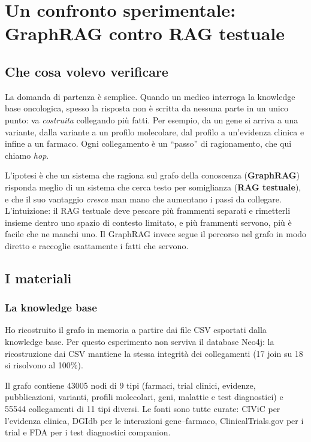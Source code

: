 \documentclass[11pt,a4paper]{report}
\begin{document}
\chapter{Un confronto sperimentale: GraphRAG contro RAG testuale}
\label{ch:graphrag-vs-rag}

\section{Che cosa volevo verificare}

La domanda di partenza è semplice. Quando un medico interroga la knowledge
base oncologica, spesso la risposta non è scritta da nessuna parte in un
unico punto: va \emph{costruita} collegando più fatti. Per esempio, da un
gene si arriva a una variante, dalla variante a un profilo molecolare, dal
profilo a un'evidenza clinica e infine a un farmaco. Ogni collegamento è un
``passo'' di ragionamento, che qui chiamo \emph{hop}.

L'ipotesi è che un sistema che ragiona sul grafo della conoscenza
(\textbf{GraphRAG}) risponda meglio di un sistema che cerca testo per
somiglianza (\textbf{RAG testuale}), e che il suo vantaggio \emph{cresca}
man mano che aumentano i passi da collegare. L'intuizione: il RAG testuale
deve pescare più frammenti separati e rimetterli insieme dentro uno spazio
di contesto limitato, e più frammenti servono, più è facile che ne manchi
uno. Il GraphRAG invece segue il percorso nel grafo in modo diretto e
raccoglie esattamente i fatti che servono.

\section{I materiali}

\subsection{La knowledge base}

Ho ricostruito il grafo in memoria a partire dai file CSV esportati dalla
knowledge base. Per questo esperimento non serviva il database Neo4j: la
ricostruzione dai CSV mantiene la stessa integrità dei collegamenti
(17 join su 18 si risolvono al 100\%).

Il grafo contiene \num{43005} nodi di 9 tipi (farmaci, trial clinici,
evidenze, pubblicazioni, varianti, profili molecolari, geni, malattie e
test diagnostici) e \num{55544} collegamenti di 11 tipi diversi. Le fonti
sono tutte curate: CIViC per l'evidenza clinica, DGIdb per le interazioni
gene--farmaco, ClinicalTrials.gov per i trial e FDA per i test diagnostici
companion.
\end{document}
